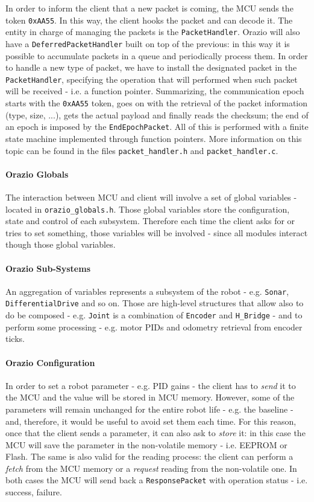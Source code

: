 \documentclass[10pt,a4paper, notitlepage]{report}
\begin{document}
In order to inform the client that a new packet is coming, the MCU sends the token \texttt{0xAA55}. In this way, the client hooks the packet and can decode it. The entity in charge of managing the packets is the \texttt{PacketHandler}. Orazio will also have a \texttt{DeferredPacketHandler} built on top of the previous: in this way it is possible to accumulate packets in a queue and periodically process them. In order to handle a new type of packet, we have to install the designated packet in the \texttt{PacketHandler}, specifying the operation that will performed when such packet will be received - i.e. a function pointer. Summarizing, the communication epoch starts with the \texttt{0xAA55} token, goes on with the retrieval of the packet information (type, size, ...), gets the actual payload and finally reads the checksum; the end of an epoch is imposed by the \texttt{EndEpochPacket}. All of this is performed with a finite state machine implemented through function pointers. More information on this topic can be found in the files \texttt{packet\_handler.h} and \texttt{packet\_handler.c}.

\paragraph{Orazio Globals} The interaction between MCU and client will involve a set of global variables - located in \texttt{orazio\_globals.h}. Those global variables store the configuration, state and control of each subsystem. Therefore each time the client asks for or tries to set something, those variables will be involved - since all modules interact though those global variables.

\paragraph{Orazio Sub-Systems} An aggregation of variables represents a subsystem of the robot - e.g. \texttt{Sonar}, \texttt{DifferentialDrive} and so on. Those are high-level structures that allow also to do be composed - e.g. \texttt{Joint} is a combination of \texttt{Encoder} and \texttt{H\_Bridge} - and to perform some processing - e.g. motor PIDs and odometry retrieval from encoder ticks.

\paragraph{Orazio Configuration} In order to set a robot parameter - e.g. PID gains - the client has to \textit{send} it to the MCU and the value will be stored in MCU memory. However, some of the parameters will remain unchanged for the entire robot life - e.g. the baseline - and, therefore, it would be useful to avoid set them each time. For this reason, once that the client sends a parameter, it can also ask to \textit{store} it: in this case the MCU will save the parameter in the non-volatile memory - i.e. EEPROM or Flash.
The same is also valid for the reading process: the client can perform a \textit{fetch} from the MCU memory or a \textit{request} reading from the non-volatile one. 
In both cases the MCU will send back a \texttt{ResponsePacket} with operation status - i.e. success, failure.
\end{document}
